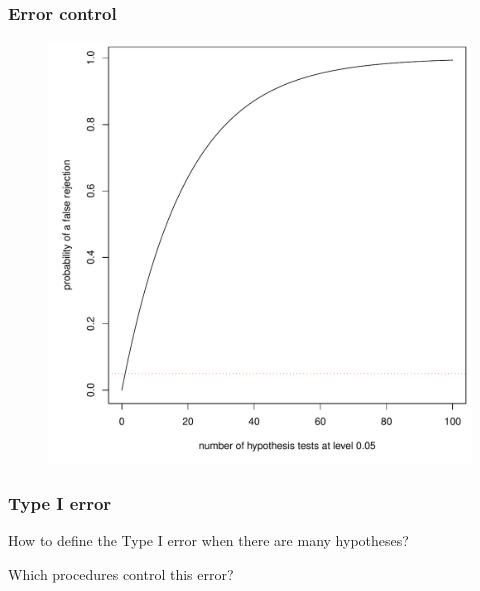 \documentclass[xcolor={pdftex,dvipsnames,table}]{beamer}
\newcommand{\bb}[1]{\begin{block}{#1}}
\newcommand{\eb}{\end{block}}
\begin{document}
\begin{frame}
\frametitle{Error control}
\begin{figure}
    \centering
\includegraphics[scale=.3]{plaatjes/typeI}
\end{figure}
\end{frame}


\begin{frame}
\frametitle{Type I error}
\bb{How to define the Type I error when there are many hypotheses?}
\eb
\bb{Which procedures control this error?}
\eb
\end{frame}
\end{document}
